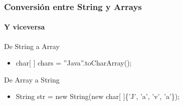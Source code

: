 \documentclass{beamer}
\begin{document}
\begin{frame}
\frametitle{Conversión entre String y Arrays}
\framesubtitle{Y viceversa}
\begin{block}{De String a Array}
\begin{itemize}[<+-| alert@+>]
\item char[ ] chars = ''Java''.toCharArray();
\end{itemize}
\end{block}
\pause
\begin{block}{De Array a String }
\begin{itemize}[<+-| alert@+>]
\item String str = new String(new char[ ]\{'J', 'a', 'v', 'a'\});
\end{itemize}
\end{block}
\pause
\end{frame}
\end{document}
